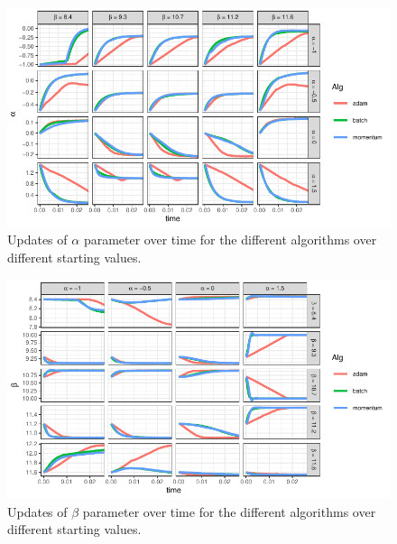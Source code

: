 \documentclass[aspectratio=1610,onlytextwidth]{beamer}
\begin{document}

\begin{frame}[c]
  \begin{figure}[htpb]
    \centering
    \includegraphics[]{images/nonlinear-alpha.pdf}
    \caption{%
      Updates of \(\alpha\) parameter over time for the different algorithms over
      different starting values.
    }
  \end{figure}

\end{frame}

\begin{frame}[c]
  \begin{figure}[htpb]
    \centering
    \includegraphics[]{images/nonlinear-beta.pdf}
    \caption{%
      Updates of \(\beta\) parameter over time for the different algorithms over
      different starting values.
    }
  \end{figure}
\end{frame}
\end{document}
